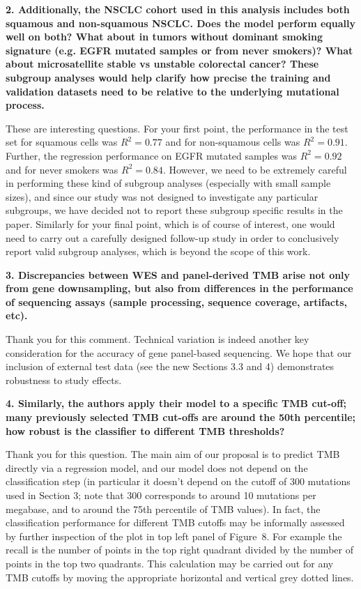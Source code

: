 \documentclass[12pt]{article}
\begin{document}

\textbf{2. Additionally, the NSCLC cohort used in this analysis includes both squamous and non-squamous NSCLC. Does the model perform equally well on both? What about in tumors without dominant smoking signature (e.g. EGFR mutated samples or from never smokers)? What about microsatellite stable vs unstable colorectal cancer? These subgroup analyses would help clarify how precise the training and validation datasets need to be relative to the underlying mutational process. }


These are interesting questions.  For your first point, the performance in the test set for squamous cells was $R^2 = 0.77$ and for non-squamous cells was $R^2 = 0.91$. Further, the regression performance on EGFR mutated samples was $R^2 = 0.92$ and for never smokers was $R^2 = 0.84$.  However, we need to be extremely careful in performing these kind of subgroup analyses (especially with small sample sizes), and since our study was not designed to investigate any particular subgroups, we have decided not to report these subgroup specific results in the paper.  Similarly for your final point, which is of course of interest, one would need to carry out a carefully designed follow-up study in order to conclusively report valid subgroup analyses, which is beyond the scope of this work.  

\textbf{3. Discrepancies between WES and panel-derived TMB arise not only from gene downsampling, but also from differences in the performance of sequencing assays (sample processing, sequence coverage, artifacts, etc).}

Thank you for this comment. Technical variation is indeed another key consideration for the accuracy of gene panel-based sequencing. We hope that our inclusion of external test data (see the new Sections 3.3 and 4) demonstrates robustness to study effects.   

\textbf{4. Similarly, the authors apply their model to a specific TMB cut-off; many previously selected TMB cut-offs are around the 50th percentile; how robust is the classifier to different TMB thresholds?}

Thank you for this question.  The main aim of our proposal is to predict TMB directly via a regression model, and our model does not depend on the classification step (in particular it doesn't depend on the cutoff of 300 mutations used in Section 3;  note that 300 corresponds to around 10 mutations per megabase, and to around the 75th percentile of TMB values).  In fact, the classification performance for different TMB cutoffs may be informally assessed by further inspection of the plot in top left panel of Figure~8.  For example the recall is the number of points in the top right quadrant divided by the number of points in the top two quadrants.  This calculation may be carried out for any TMB cutoffs by moving the appropriate horizontal and vertical grey dotted lines. 
\end{document}
